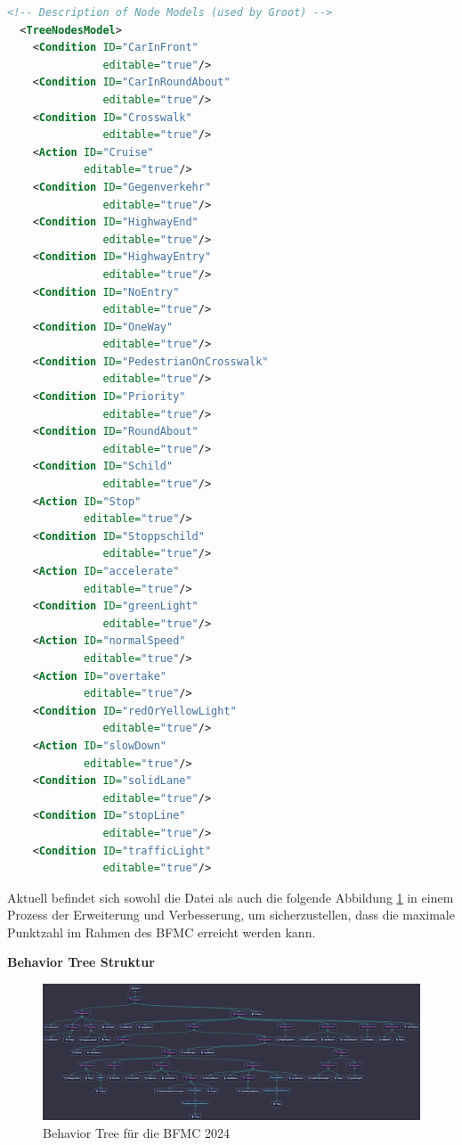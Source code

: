 \begin{lstlisting}[language=xml, caption={Behavior Tree - XML Struktur}]
  <!-- Description of Node Models (used by Groot) -->
  <TreeNodesModel>
    <Condition ID="CarInFront"
               editable="true"/>
    <Condition ID="CarInRoundAbout"
               editable="true"/>
    <Condition ID="Crosswalk"
               editable="true"/>
    <Action ID="Cruise"
            editable="true"/>
    <Condition ID="Gegenverkehr"
               editable="true"/>
    <Condition ID="HighwayEnd"
               editable="true"/>
    <Condition ID="HighwayEntry"
               editable="true"/>
    <Condition ID="NoEntry"
               editable="true"/>
    <Condition ID="OneWay"
               editable="true"/>
    <Condition ID="PedestrianOnCrosswalk"
               editable="true"/>
    <Condition ID="Priority"
               editable="true"/>
    <Condition ID="RoundAbout"
               editable="true"/>
    <Condition ID="Schild"
               editable="true"/>
    <Action ID="Stop"
            editable="true"/>
    <Condition ID="Stoppschild"
               editable="true"/>
    <Action ID="accelerate"
            editable="true"/>
    <Condition ID="greenLight"
               editable="true"/>
    <Action ID="normalSpeed"
            editable="true"/>
    <Action ID="overtake"
            editable="true"/>
    <Condition ID="redOrYellowLight"
               editable="true"/>
    <Action ID="slowDown"
            editable="true"/>
    <Condition ID="solidLane"
               editable="true"/>
    <Condition ID="stopLine"
               editable="true"/>
    <Condition ID="trafficLight"
               editable="true"/>
\end{lstlisting}

Aktuell befindet sich sowohl die Datei als auch die folgende Abbildung \ref{fig:bt_bfmc24} in einem Prozess der Erweiterung und Verbesserung, um sicherzustellen, dass die maximale Punktzahl im Rahmen des \gls{BFMC} erreicht werden kann.

\newpage
\textbf{Behavior Tree Struktur}

\begin{figure}[!h]
    \centering
    \includegraphics[width=1.4\linewidth, angle=90]{Pictures/behavior_tree_groot2.png}
    \caption{Behavior Tree für die \gls{BFMC} 2024}
    \label{fig:bt_bfmc24}
\end{figure}


